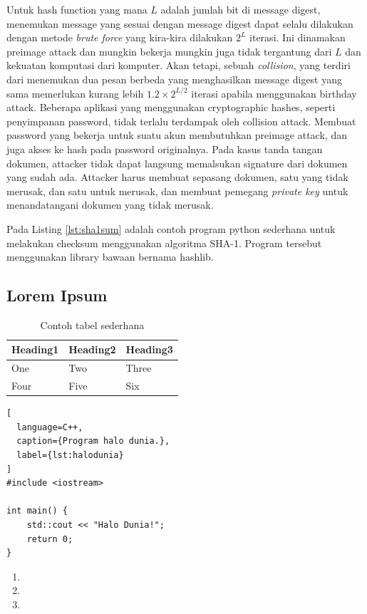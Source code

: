 Untuk hash function yang mana \(L\) adalah jumlah bit di message digest, menemukan message yang sesuai dengan message digest dapat selalu dilakukan dengan metode \emph{brute force} yang kira-kira dilakukan \(2^L\) iterasi. Ini dinamakan preimage attack dan mungkin bekerja mungkin juga tidak tergantung dari \(L\) dan kekuatan komputasi dari komputer. Akan tetapi, sebuah \emph{collision}, yang terdiri dari menemukan dua pesan berbeda yang menghasilkan message digest yang sama memerlukan kurang lebih \(1.2\times{2^{L/2}}\) iterasi apabila menggunakan birthday attack. Beberapa aplikasi yang menggunakan cryptographic hashes, seperti penyimpanan password, tidak terlalu terdampak oleh collision attack. Membuat password yang bekerja untuk suatu akun membutuhkan preimage attack, dan juga akses ke hash pada password originalnya. Pada kasus tanda tangan dokumen, attacker tidak dapat langsung memalsukan signature dari dokumen yang sudah ada. Attacker harus membuat sepasang dokumen, satu yang tidak merusak, dan satu untuk merusak, dan membuat pemegang \emph{private key} untuk menandatangani dokumen yang tidak merusak.



Pada Listing \ref{lst:sha1sum} adalah contoh program python sederhana untuk melakukan checksum menggunakan algoritma SHA-1. Program tersebut menggunakan library bawaan bernama hashlib.

\subsection{Lorem Ipsum}
\label{subsec:loremipsum}

\lipsum[11]

\begin{table}
  \caption{Contoh tabel sederhana}
  \label{tab:tabelsederhana}
  \centering
  \begin{tabular}{lll}
    \toprule
    Heading1 & Heading2 & Heading3  \\
    \midrule
    One      & Two      & Three     \\
    Four     & Five     & Six       \\
    \bottomrule
  \end{tabular}
\end{table}

\begin{lstlisting}[
  language=C++,
  caption={Program halo dunia.},
  label={lst:halodunia}
]
#include <iostream>

int main() {
    std::cout << "Halo Dunia!";
    return 0;
}
\end{lstlisting}

\lipsum[12]

\begin{enumerate}
  \item \lipsum[13][1-4]
  \item \lipsum[13][5-8]
  \item \lipsum[13][9-12]
\end{enumerate}

\lipsum[14-15]
